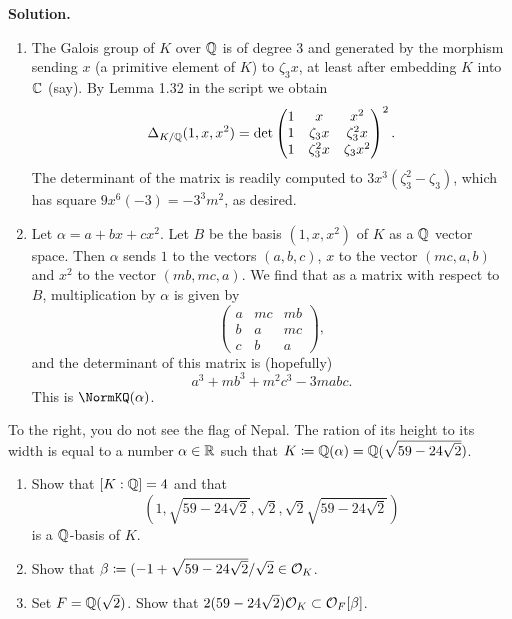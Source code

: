 \documentclass[a4paper,11pt]{article}
\begin{document}
\textbf{Solution.} 
\begin{enumerate}
    \item The Galois group of $K$ over $\mathbb{Q}$ is of degree $3$ and generated by the 
        morphism sending $x$ (a primitive element of $K$) to $\zeta_3 x$, at least 
        after embedding $K$ into $\mathbb{C}$ (say). By Lemma 1.32 in the script we obtain
        \begin{equation*}
            \Delta_{K/\mathbb{Q}}(1,x,x^2) = \det \begin{pmatrix}
                                            1 & x & x^2 \\
                                            1 & \zeta_3 x & \zeta_3^2 x \\
                                            1 & \zeta_3^2 x & \zeta_3 x^2
                                          \end{pmatrix}^2.
        \end{equation*}
        The determinant of the matrix is readily computed to $3x^3(\zeta_3^2 - 
        \zeta_3)$, which has square $9x^6(-3) = -3^3m^2$, as desired.

    \item Let $\alpha = a + bx + cx^2$. Let $B$ be the basis $(1,x,x^2)$ of $K$
        as a $\mathbb{Q}$ vector space. Then $\alpha$ sends $1$ to the vectors
        $(a,b,c)$, $x$ to the vector $(mc, a, b)$ and $x^2$ to the vector
        $(mb, mc, a)$. We find that as a matrix with respect to $B$, 
        multiplication by $\alpha$ is given by
        \begin{equation*}
            \begin{pmatrix} 
                a  & mc & mb \\
                b  & a  & mc  \\
                c  & b  & a
            \end{pmatrix},
        \end{equation*}
        and the determinant of this matrix is (hopefully)
        \begin{equation*}
            a^3 + mb^3 + m^2 c^3 - 3mabc.
        \end{equation*}
        This is $\NormKQ(\alpha)$.
\end{enumerate}

To the right, you do not see the flag of Nepal. The ration of its height to its 
width is equal to a number $\alpha \in \mathbb{R}$ such that $K \coloneqq \mathbb{Q}(\alpha)
= \mathbb{Q}(\sqrt{59-24\sqrt 2})$.
\begin{enumerate}
    \item Show that $[K:\mathbb{Q}]=4$ and that 
        \begin{equation*}
            \left(1, \sqrt{59 - 24\sqrt 2}, \sqrt 2, \sqrt2 \sqrt{59- 24\sqrt 2}
                \right)
        \end{equation*}
        is a $\mathbb{Q}$-basis of $K$.
    \item Show that $\beta \coloneqq (-1 + \sqrt{59 - 24\sqrt 2}/\sqrt 2 \in \mathcal{O}_K$. 
    \item Set $F = \mathbb{Q}(\sqrt 2)$. Show that $2(59- 24\sqrt 2) \mathcal{O}_K \subset
        \mathcal{O}_F[\beta]$. 
\end{enumerate}


\contactend
\end{document}
